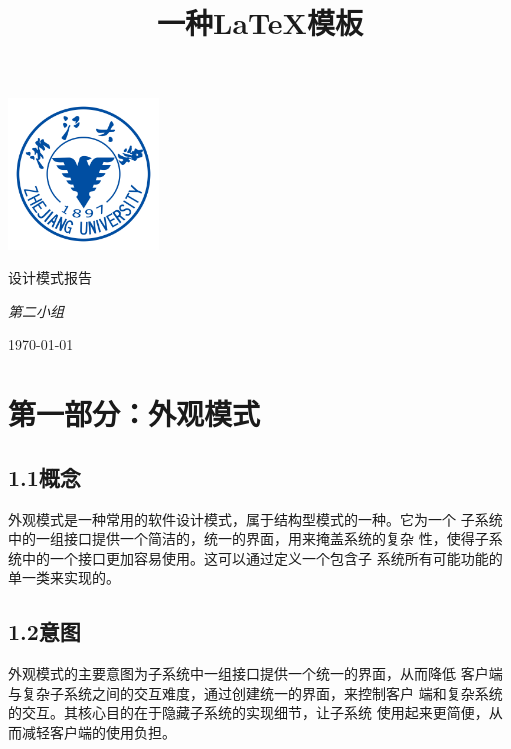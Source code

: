 \documentclass[24pt,a4paper]{article}%
\title{\fontsize{18pt}{27pt}\selectfont%
	{\heiti%
		一种\LaTeX 模板}}%
\date{}%
\begin{document}
\begin{titlepage}
    \centering
    \includegraphics[width=0.3\textwidth]{image/zju_logo.png}\par\vspace{5cm}
    {\huge\songti 设计模式报告\par}
    \vspace{1cm}
    {\Large\itshape 第二小组\par}
    \vspace{7cm}

    \vfill
    {\large \today\par}
\end{titlepage}
\newpage

\begin{center}
    \kaishu
    \tableofcontents
    \setcounter{page}{0}
    \thispagestyle{empty} %
\end{center}
\newpage

\section*{\songti 第一部分：外观模式}
\subsection*{\songti 1.1概念}
外观模式是一种常用的软件设计模式，属于结构型模式的一种。它为一个
子系统中的一组接口提供一个简洁的，统一的界面，用来掩盖系统的复杂
性，使得子系统中的一个接口更加容易使用。这可以通过定义一个包含子
系统所有可能功能的单一类来实现的。
\subsection*{\songti 1.2意图}
外观模式的主要意图为子系统中一组接口提供一个统一的界面，从而降低
客户端与复杂子系统之间的交互难度，通过创建统一的界面，来控制客户
端和复杂系统的交互。其核心目的在于隐藏子系统的实现细节，让子系统
使用起来更简便，从而减轻客户端的使用负担。
\end{document}
